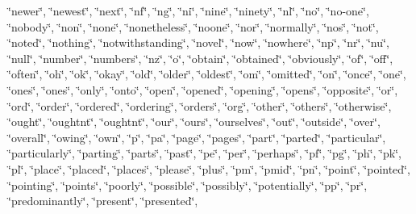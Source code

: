 \char`\"{}newer\char`\"{}, \char`\"{}newest\char`\"{}, \char`\"{}next\char`\"{}, \char`\"{}nf\char`\"{}, \char`\"{}ng\char`\"{}, \char`\"{}ni\char`\"{}, \char`\"{}nine\char`\"{}, \char`\"{}ninety\char`\"{}, \char`\"{}nl\char`\"{}, \char`\"{}no\char`\"{}, \char`\"{}no-\/one\char`\"{}, \char`\"{}nobody\char`\"{}, \char`\"{}non\char`\"{}, \char`\"{}none\char`\"{}, \char`\"{}nonetheless\char`\"{}, \char`\"{}noone\char`\"{}, \char`\"{}nor\char`\"{}, \char`\"{}normally\char`\"{}, \char`\"{}nos\char`\"{}, \char`\"{}not\char`\"{}, \char`\"{}noted\char`\"{}, \char`\"{}nothing\char`\"{}, \char`\"{}notwithstanding\char`\"{}, \char`\"{}novel\char`\"{}, \char`\"{}now\char`\"{}, \char`\"{}nowhere\char`\"{}, \char`\"{}np\char`\"{}, \char`\"{}nr\char`\"{}, \char`\"{}nu\char`\"{}, \char`\"{}null\char`\"{}, \char`\"{}number\char`\"{}, \char`\"{}numbers\char`\"{}, \char`\"{}nz\char`\"{}, \char`\"{}o\char`\"{}, \char`\"{}obtain\char`\"{}, \char`\"{}obtained\char`\"{}, \char`\"{}obviously\char`\"{}, \char`\"{}of\char`\"{}, \char`\"{}off\char`\"{}, \char`\"{}often\char`\"{}, \char`\"{}oh\char`\"{}, \char`\"{}ok\char`\"{}, \char`\"{}okay\char`\"{}, \char`\"{}old\char`\"{}, \char`\"{}older\char`\"{}, \char`\"{}oldest\char`\"{}, \char`\"{}om\char`\"{}, \char`\"{}omitted\char`\"{}, \char`\"{}on\char`\"{}, \char`\"{}once\char`\"{}, \char`\"{}one\char`\"{}, \char`\"{}one\textquotesingle{}s\char`\"{}, \char`\"{}ones\char`\"{}, \char`\"{}only\char`\"{}, \char`\"{}onto\char`\"{}, \char`\"{}open\char`\"{}, \char`\"{}opened\char`\"{}, \char`\"{}opening\char`\"{}, \char`\"{}opens\char`\"{}, \char`\"{}opposite\char`\"{}, \char`\"{}or\char`\"{}, \char`\"{}ord\char`\"{}, \char`\"{}order\char`\"{}, \char`\"{}ordered\char`\"{}, \char`\"{}ordering\char`\"{}, \char`\"{}orders\char`\"{}, \char`\"{}org\char`\"{}, \char`\"{}other\char`\"{}, \char`\"{}others\char`\"{}, \char`\"{}otherwise\char`\"{}, \char`\"{}ought\char`\"{}, \char`\"{}oughtn\textquotesingle{}t\char`\"{}, \char`\"{}oughtnt\char`\"{}, \char`\"{}our\char`\"{}, \char`\"{}ours\char`\"{}, \char`\"{}ourselves\char`\"{}, \char`\"{}out\char`\"{}, \char`\"{}outside\char`\"{}, \char`\"{}over\char`\"{}, \char`\"{}overall\char`\"{}, \char`\"{}owing\char`\"{}, \char`\"{}own\char`\"{}, \char`\"{}p\char`\"{}, \char`\"{}pa\char`\"{}, \char`\"{}page\char`\"{}, \char`\"{}pages\char`\"{}, \char`\"{}part\char`\"{}, \char`\"{}parted\char`\"{}, \char`\"{}particular\char`\"{}, \char`\"{}particularly\char`\"{}, \char`\"{}parting\char`\"{}, \char`\"{}parts\char`\"{}, \char`\"{}past\char`\"{}, \char`\"{}pe\char`\"{}, \char`\"{}per\char`\"{}, \char`\"{}perhaps\char`\"{}, \char`\"{}pf\char`\"{}, \char`\"{}pg\char`\"{}, \char`\"{}ph\char`\"{}, \char`\"{}pk\char`\"{}, \char`\"{}pl\char`\"{}, \char`\"{}place\char`\"{}, \char`\"{}placed\char`\"{}, \char`\"{}places\char`\"{}, \char`\"{}please\char`\"{}, \char`\"{}plus\char`\"{}, \char`\"{}pm\char`\"{}, \char`\"{}pmid\char`\"{}, \char`\"{}pn\char`\"{}, \char`\"{}point\char`\"{}, \char`\"{}pointed\char`\"{}, \char`\"{}pointing\char`\"{}, \char`\"{}points\char`\"{}, \char`\"{}poorly\char`\"{}, \char`\"{}possible\char`\"{}, \char`\"{}possibly\char`\"{}, \char`\"{}potentially\char`\"{}, \char`\"{}pp\char`\"{}, \char`\"{}pr\char`\"{}, \char`\"{}predominantly\char`\"{}, \char`\"{}present\char`\"{}, \char`\"{}presented\char`\"{}, 